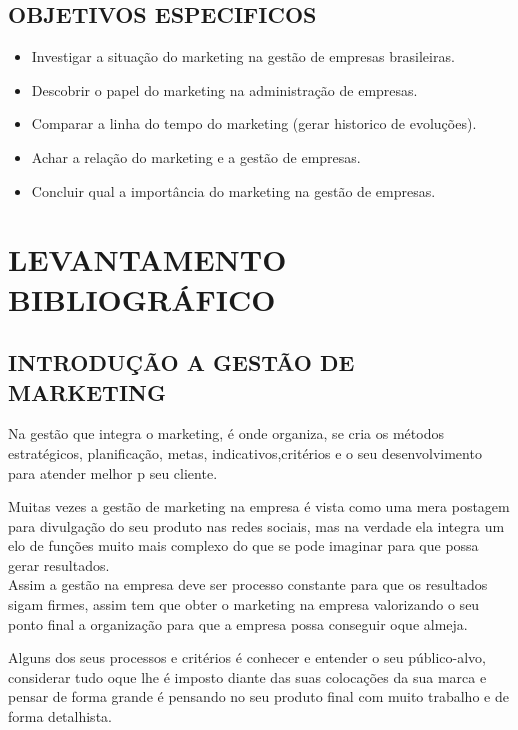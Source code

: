 \documentclass[article, a4paper, 12pt, brazil]{abntex2}
\begin{document}
   \subsection{OBJETIVOS ESPECIFICOS}

   \begin{itemize}[noitemsep]
      \item {Investigar a situação do marketing na gestão de empresas brasileiras.}\\
      \item {Descobrir o papel do marketing na administração de empresas.}\\
      \item Comparar a linha do tempo do marketing (gerar historico de evoluções).\\
      \item Achar a relação do marketing e a gestão de empresas.\\
      \item Concluir qual a importância do marketing na gestão de empresas.\\
   \end{itemize}
   \pagebreak
   \section{LEVANTAMENTO BIBLIOGRÁFICO}
   \subsection{INTRODUÇÃO A GESTÃO DE MARKETING}
   \par Na gestão que integra o marketing, é onde organiza, se cria os métodos estratégicos, planificação, metas, indicativos,critérios e o seu desenvolvimento para atender melhor p seu cliente.\\
   \par Muitas vezes a gestão de marketing na empresa é vista como uma mera postagem para divulgação do seu produto nas redes sociais, mas na verdade ela integra um elo de funções muito mais complexo do que se pode imaginar para que possa gerar resultados.\\
   Assim a gestão na empresa deve ser processo constante para que os resultados sigam firmes, assim tem que obter o marketing na empresa valorizando o seu ponto final a organização para que a empresa possa conseguir oque almeja.\\
   \par Alguns dos seus processos e critérios é conhecer e entender o seu público-alvo, considerar tudo oque lhe é imposto diante das suas colocações da sua marca e pensar de forma grande é pensando no seu produto final com muito trabalho e de forma detalhista.\\
\end{document}

